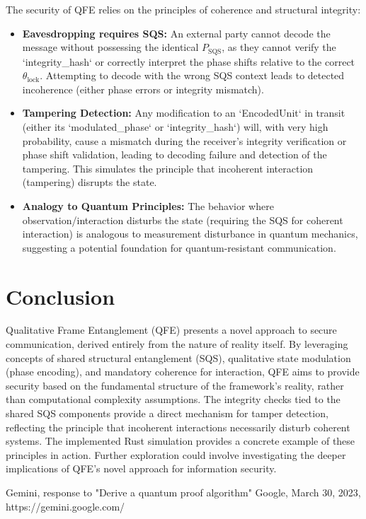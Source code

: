 \documentclass[11pt]{article}
\newcommand{\SQS}{P_{\text{SQS}}}        %
\newcommand{\SQSphase}{\theta_{\text{lock}}} %
\begin{document}
	The security of QFE relies on the principles of coherence and structural integrity:
	\begin{itemize}
		\item \textbf{Eavesdropping requires SQS:} An external party cannot decode the message without possessing the identical $\SQS$, as they cannot verify the `integrity\_hash` or correctly interpret the phase shifts relative to the correct $\SQSphase$. Attempting to decode with the wrong SQS context leads to detected incoherence (either phase errors or integrity mismatch).
		\item \textbf{Tampering Detection:} Any modification to an `EncodedUnit` in transit (either its `modulated\_phase` or `integrity\_hash`) will, with very high probability, cause a mismatch during the receiver's integrity verification or phase shift validation, leading to decoding failure and detection of the tampering. This simulates the principle that incoherent interaction (tampering) disrupts the state.
		\item \textbf{Analogy to Quantum Principles:} The behavior where observation/interaction disturbs the state (requiring the SQS for coherent interaction) is analogous to measurement disturbance in quantum mechanics, suggesting a potential foundation for quantum-resistant communication.
	\end{itemize}
	
	\section{Conclusion}
	
	Qualitative Frame Entanglement (QFE) presents a novel approach to secure communication, derived entirely from the nature of reality itself. By leveraging concepts of shared structural entanglement (SQS), qualitative state modulation (phase encoding), and mandatory coherence for interaction, QFE aims to provide security based on the fundamental structure of the framework's reality, rather than computational complexity assumptions. The integrity checks tied to the shared SQS components provide a direct mechanism for tamper detection, reflecting the principle that incoherent interactions necessarily disturb coherent systems. The implemented Rust simulation provides a concrete example of these principles in action. Further exploration could involve investigating the deeper implications of QFE's novel approach for information security.
	
	\begin{thebibliography}{1}
		Gemini, response to "Derive a quantum proof algorithm" Google, March 30, 2023, https://gemini.google.com/ 	
	\end{thebibliography}
	
	
\end{document}
